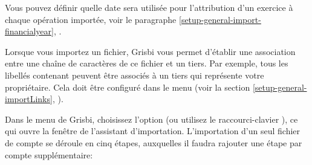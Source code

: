 Vous pouvez définir quelle date sera utilisée pour l'attribution d'un exercice à chaque opération importée, voir le paragraphe \vref{setup-general-import-financialyear}, .

Lorsque vous importez un fichier, Grisbi vous permet d'établir une association entre une chaîne de caractères de ce fichier et un tiers. Par exemple, tous les libellés contenant  peuvent être associés à un tiers qui représente votre propriétaire. Cela doit être configuré dans le menu  (voir la section \vref{setup-general-importLinks}, ).

Dans le menu  de Grisbi, choisissez l'option  (ou utilisez le raccourci-clavier ), ce qui ouvre la fenêtre de l'assistant d'importation. L'importation d'un seul fichier de compte se déroule en cinq étapes, auxquelles il faudra rajouter une étape par compte supplémentaire:

